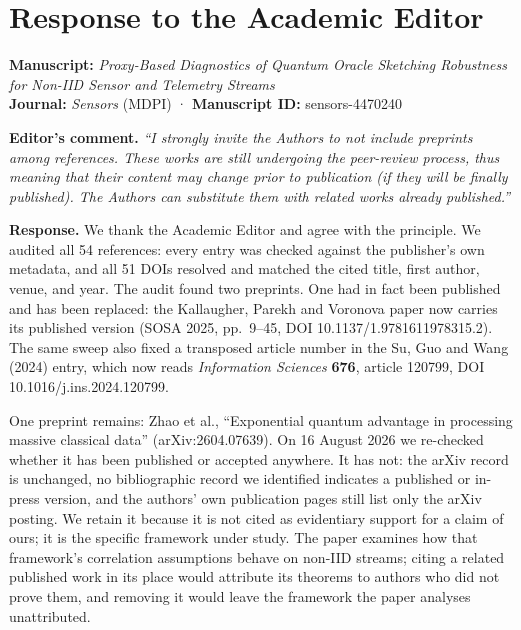 \documentclass[
  11pt,
]{article}
\author{}
\date{}
\begin{document}
\section{Response to the Academic
Editor}\label{response-to-the-academic-editor}

\textbf{Manuscript:} \emph{Proxy-Based Diagnostics of Quantum Oracle
Sketching Robustness for Non-IID Sensor and Telemetry Streams}\\
\textbf{Journal:} \emph{Sensors} (MDPI) · \textbf{Manuscript ID:}
sensors-4470240

\textbf{Editor's comment.} \emph{``I strongly invite the Authors to not
include preprints among references. These works are still undergoing the
peer-review process, thus meaning that their content may change prior to
publication (if they will be finally published). The Authors can
substitute them with related works already published.''}

\textbf{Response.} We thank the Academic Editor and agree with the
principle. We audited all 54 references: every entry was checked against
the publisher's own metadata, and all 51 DOIs resolved and matched the
cited title, first author, venue, and year. The audit found two
preprints. One had in fact been published and has been replaced: the
Kallaugher, Parekh and Voronova paper now carries its published version
(SOSA 2025, pp.~9--45, DOI 10.1137/1.9781611978315.2). The same sweep
also fixed a transposed article number in the Su, Guo and Wang (2024)
entry, which now reads \emph{Information Sciences} \textbf{676}, article
120799, DOI 10.1016/j.ins.2024.120799.

One preprint remains: Zhao et al., ``Exponential quantum advantage in
processing massive classical data'' (arXiv:2604.07639). On 16 August
2026 we re-checked whether it has been published or accepted anywhere.
It has not: the arXiv record is unchanged, no bibliographic record we
identified indicates a published or in-press version, and the authors'
own publication pages still list only the arXiv posting. We retain it
because it is not cited as evidentiary support for a claim of ours; it
is the specific framework under study. The paper examines how that
framework's correlation assumptions behave on non-IID streams; citing a
related published work in its place would attribute its theorems to
authors who did not prove them, and removing it would leave the
framework the paper analyses unattributed.
\end{document}
